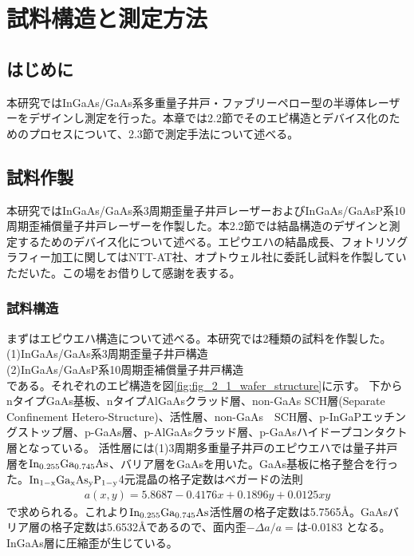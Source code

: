 
\chapter{試料構造と測定方法}%
\section{はじめに}%
本研究ではInGaAs/GaAs系多重量子井戸・ファブリーペロー型の半導体レーザーをデザインし測定を行った。本章では2.2節でそのエピ構造とデバイス化のためのプロセスについて、2.3節で測定手法について述べる。
\section{試料作製}%
本研究ではInGaAs/GaAs系3周期歪量子井戸レーザーおよびInGaAs/GaAsP系10周期歪補償量子井戸レーザーを作製した。本2.2節では結晶構造のデザインと測定するためのデバイス化について述べる。エピウエハの結晶成長、フォトリソグラフィー加工に関してはNTT-AT社、オプトウェル社に委託し試料を作製していただいた。この場をお借りして感謝を表する。

\subsection{試料構造}%
まずはエピウエハ構造について述べる。本研究では2種類の試料を作製した。\\
(1)InGaAs/GaAs系3周期歪量子井戸構造\\
(2)InGaAs/GaAsP系10周期歪補償量子井戸構造\\
である。それぞれのエピ構造を図\ref{fig:fig_2_1_wafer_structure}に示す。
下からnタイプGaAs基板、nタイプAlGaAsクラッド層、non-GaAs SCH層(Separate Confinement Hetero-Structure)、活性層、non-GaAs　SCH層、p-InGaPエッチングストップ層、p-GaAs層、p-AlGaAsクラッド層、p-GaAsハイドープコンタクト層となっている。
活性層には(1)3周期多重量子井戸のエピウエハでは量子井戸層を$\rm{In_{0.255}Ga_{0.745}As}$、バリア層をGaAsを用いた。GaAs基板に格子整合を行った。$\rm{In_{1-x}Ga_{x}As_{y}P_{1-y}}$4元混晶の格子定数はべガードの法則
\begin{eqnarray}
a(x,y)=5.8687-0.4176x+0.1896y+0.0125xy
\end{eqnarray}
で求められる\cite{ref_iga}。これより$\rm{In_{0.255}Ga_{0.745}As}$活性層の格子定数は5.7565\AA 。GaAsバリア層の格子定数は5.6532\AA であるので、面内歪$-\Delta a/a=$は-0.0183 となる。InGaAs層に圧縮歪が生じている。

